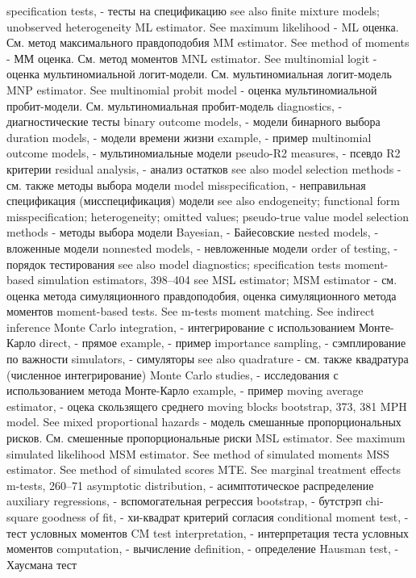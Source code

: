 specification tests, - тесты на спецификацию
see also finite mixture models; unobserved heterogeneity
ML estimator. See maximum likelihood - ML оценка. См. метод максимального правдоподобия
MM estimator. See method of moments - ММ оценка. См. метод моментов
MNL estimator. See multinomial logit - оценка мультиномиальной логит-модели. См. мультиномиальная логит-модель
MNP estimator. See multinomial probit model - оценка мультиномиальной пробит-модели. См. мультиномиальная пробит-модель
diagnostics, - диагностические тесты
binary outcome models, - модели бинарного выбора 
duration models, - модели времени жизни 
example, - пример
multinomial outcome models, - мультиномиальные модели 
pseudo-R2 measures, - псевдо R2 критерии
residual analysis, - анализ остатков
see also model selection methods - см. также методы выбора модели
model misspecification, - неправильная спецификация (мисспецификация) модели
see also endogeneity; functional form misspecification; heterogeneity; omitted values; pseudo-true value
model selection methods - методы выбора модели
Bayesian, - Байесовские
nested models, - вложенные модели 
nonnested models, - невложенные модели 
order of testing, - порядок тестирования
see also model diagnostics; specification tests 
moment-based simulation estimators,
398–404
see MSL estimator; MSM estimator - см. оценка метода симуляционного правдоподобия, оценка симуляционного метода моментов
moment-based tests. See m-tests moment matching. See indirect inference 
Monte Carlo integration, - интегрирование с использованием Монте-Карло
direct, - прямое
example, - пример
importance sampling, - сэмплирование по важности 
simulators, - симуляторы
see also quadrature - см. также квадратура (численное интегрирование)
Monte Carlo studies, - исследования с использованием метода Монте-Карло
example, - пример
moving average estimator, - оцека скользящего среднего
moving blocks bootstrap, 373, 381
MPH model. See mixed proportional hazards - модель смешанные пропорциональных рисков. См. смешенные пропорциональные риски
MSL estimator. See maximum simulated likelihood MSM estimator. See method of simulated moments MSS estimator. See method of simulated scores MTE. See marginal treatment effects
m-tests, 260–71
asymptotic distribution, - асимптотическое распределение
auxiliary regressions, - вспомогательная регрессия
bootstrap, - бутстрэп
chi-square goodness of fit, - хи-квадрат критерий согласия
conditional moment test, - тест условных моментов 
CM test interpretation, - интерпретация теста условных моментов
computation, - вычисление
definition, - определение
Hausman test, - Хаусмана тест
